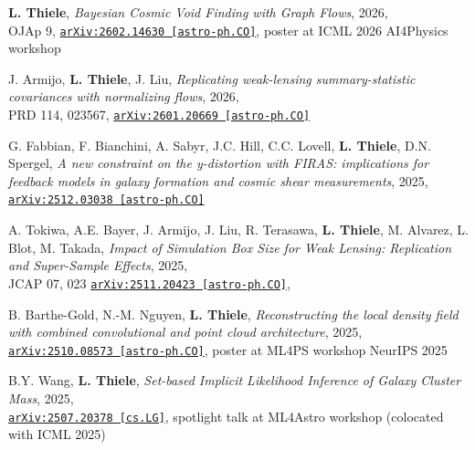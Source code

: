 \begin{minipage}{\textwidth}
{\bf L. Thiele}, \emph{Bayesian Cosmic Void Finding with Graph Flows}, 2026,\\
OJAp 9,
\href{https://arxiv.org/abs/2602.14630}{\mbox{\texttt{arXiv:2602.14630 [astro-ph.CO]}}},
poster at ICML 2026 AI4Physics workshop
\end{minipage}

\begin{minipage}{\textwidth}
J. Armijo, {\bf L. Thiele}, J. Liu, \emph{Replicating weak-lensing summary-statistic covariances with normalizing flows}, 2026,\\
PRD 114, 023567,
\href{https://arxiv.org/abs/2601.20669}{\mbox{\texttt{arXiv:2601.20669 [astro-ph.CO]}}}
\end{minipage}

\begin{minipage}{\textwidth}
G. Fabbian, F. Bianchini, A. Sabyr, J.C. Hill, C.C. Lovell, {\bf L. Thiele}, D.N. Spergel, \emph{A new constraint on the y-distortion with FIRAS: implications for feedback models in galaxy formation and cosmic shear measurements}, 2025,\\
\href{https://arxiv.org/abs/2512.03038}{\mbox{\texttt{arXiv:2512.03038 [astro-ph.CO]}}}
\end{minipage}

\begin{minipage}{\textwidth}
A. Tokiwa, A.E. Bayer, J. Armijo, J. Liu, R. Terasawa, {\bf L. Thiele}, M. Alvarez, L. Blot, M. Takada, \emph{Impact of Simulation Box Size for Weak Lensing: Replication and Super-Sample Effects}, 2025,\\
JCAP 07, 023
\href{https://arxiv.org/abs/2511.20423}{\mbox{\texttt{arXiv:2511.20423 [astro-ph.CO]}}},
\end{minipage}

\begin{minipage}{\textwidth}
B. Barthe-Gold, N.-M. Nguyen, {\bf L. Thiele}, \emph{Reconstructing the local density field with combined convolutional and point cloud architecture}, 2025,\\
\href{https://arxiv.org/abs/2510.08573}{\mbox{\texttt{arXiv:2510.08573 [astro-ph.CO]}}}, poster at ML4PS workshop NeurIPS 2025
\end{minipage}

\begin{minipage}{\textwidth}
B.Y. Wang, {\bf L. Thiele}, \emph{Set-based Implicit Likelihood Inference of Galaxy Cluster Mass}, 2025,\\
\href{https://arxiv.org/abs/2507.20378}{\mbox{\texttt{arXiv:2507.20378 [cs.LG]}}}, spotlight talk at ML4Astro workshop (colocated with ICML 2025)
\end{minipage}

